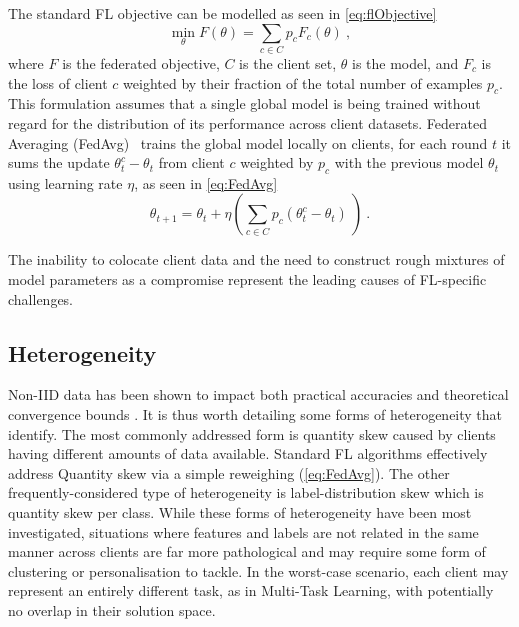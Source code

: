 
The standard FL objective can be modelled as seen in \cref{eq:flObjective}
\begin{equation} \label{eq:flObjective}
    \underset{\theta}{\min} F(\theta) = \sum_{c \in C} p_c F_c(\theta) \ ,
\end{equation}
where \(F\) is the federated objective, $C$ is the client set, $\theta$ is the model, and \(F_c\) is the loss of client \(c\) weighted by their fraction of the total number of examples $p_c$. This formulation assumes that a single global model is being trained without regard for the distribution of its performance across client datasets. Federated Averaging (FedAvg)~\citep{FedAvg} trains the global model locally on clients, for each round $t$ it sums the update \(\theta_t^c - \theta_t\) from client $c$ weighted by \(p_c\) with the previous model \(\theta_t\) using learning rate \( \eta \), as seen in \cref{eq:FedAvg}
\begin{equation} \label{eq:FedAvg}
    \theta_{t+1} = \theta_t + \eta \left( \sum_{c \in C} p_c \left(\theta_t^c - \theta_t \right) \ \right) \ .
\end{equation}

The inability to colocate client data and the need to construct rough mixtures of model parameters as a compromise represent the leading causes of FL-specific challenges.

\subsection{Heterogeneity}\label{background:data_heterogeneity}

Non-IID data has been shown to impact both practical accuracies \citep{FLwithNonIID, NonIIDQagmire} and theoretical convergence bounds \citep{OnTheConvergenceOfFedAvgOnNonIIDdata}. It is thus worth detailing some forms of heterogeneity that \citet{AdvancedAndOpenProblems} identify. The most commonly addressed form is quantity skew caused by clients having different amounts of data available. Standard FL algorithms effectively address Quantity skew via a simple reweighing (\cref{eq:FedAvg}). The other frequently-considered type of heterogeneity is label-distribution skew which is quantity skew per class. While these forms of heterogeneity have been most investigated, situations where features and labels are not related in the same manner across clients are far more pathological and may require some form of clustering or personalisation to tackle. In the worst-case scenario, each client may represent an entirely different task, as in Multi-Task Learning, with potentially no overlap in their solution space.


